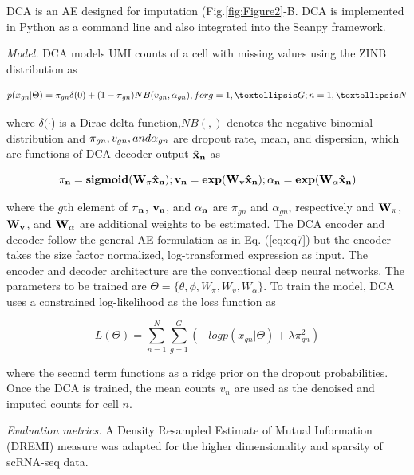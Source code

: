 \documentclass[
]{book}
\begin{document}
DCA \citep{RN53} is an AE designed for imputation (Fig.\ref{fig:Figure2}-B. DCA is implemented in Python as a command line and also integrated into the Scanpy framework.

\emph{Model.} DCA models UMI counts of a cell with missing values using the ZINB distribution as

\begin{equation}
p(x_{gn} \vert \Theta)=\pi_{gn}\delta(0)+(1-\pi_{gn})NB(v_{gn},\alpha_{gn}),\space for\space g=1,…G; n=1,…N \label{eq:eq11}
\end{equation}

where \(\delta(⋅\)) is a Dirac delta function,\(NB(,)\) denotes the negative binomial distribution and \(\pi_{gn},v_{gn}, \space and \space \alpha_{gn}\) are dropout rate, mean, and dispersion, which are functions of DCA decoder output \(\bf{\hat{x}_{n}}\) as

\begin{equation}
\bf{\pi_{n}}=sigmoid(\bf{W_{\pi}\hat{x}_{n}}); \bf{v_{n}}=exp(\bf{W_{v}\hat{x}_{n}}); \bf{\alpha_{n}}=exp(\bf{W_{\alpha}\hat{x}_{n}}) \label{eq:eq12}
\end{equation}

where the \(g\)th element of \(\bf{\pi_{n}}\), \(\bf{v_{n}}\), and \(\bf{\alpha_{n}}\) are \(\pi_{gn}\) and \(\alpha_{gn}\), respectively and \(\bf{W_{\pi}}\), \(\bf{W_{v}}\), and \(\bf{W_{\alpha}}\) are additional weights to be estimated.
The DCA encoder and decoder follow the general AE formulation as in Eq. (\eqref{eq:eq7}) but the encoder takes the size factor normalized, log-transformed expression as input.
The encoder and decoder architecture are the conventional deep neural networks.
The parameters to be trained are \(\Theta=\{\theta,\phi,W_{\pi},W_{v},W_{\alpha}\}\).
To train the model, DCA uses a constrained log-likelihood as the loss function as

\begin{equation}
L(\Theta)=\sum_{n=1}^{N} \sum_{g=1}^{G} (-logp(x_{gn}\vert \Theta) + \lambda\pi^{2}_{gn} ) \label{eq:eq13}
\end{equation}

where the second term functions as a ridge prior on the dropout probabilities.
Once the DCA is trained, the mean counts \(v_{n}\) are used as the denoised and imputed counts for cell \(n\).

\emph{Evaluation metrics.} A Density Resampled Estimate of Mutual Information (DREMI) measure was adapted for the higher dimensionality and sparsity of scRNA-seq data.
\end{document}
